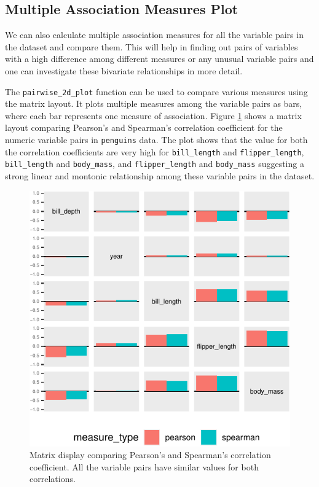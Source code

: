 \hypertarget{multiple-association-measures-plot}{%
\subsection{Multiple Association Measures
Plot}\label{multiple-association-measures-plot}}

We can also calculate multiple association measures for all the variable
pairs in the dataset and compare them. This will help in finding out
pairs of variables with a high difference among different measures or
any unusual variable pairs and one can investigate these bivariate
relationships in more detail.

The \texttt{pairwise\_2d\_plot} function can be used to compare various
measures using the matrix layout. It plots multiple measures among the
variable pairs as bars, where each bar represents one measure of
association. Figure \ref{fig:compare-matrix} shows a matrix layout
comparing Pearson's and Spearman's correlation coefficient for the
numeric variable pairs in \texttt{penguins} data. The plot shows that
the value for both the correlation coefficients are very high for
\texttt{bill\_length} and \texttt{flipper\_length},
\texttt{bill\_length} and \texttt{body\_mass}, and
\texttt{flipper\_length} and \texttt{body\_mass} suggesting a strong
linear and montonic relationship among these variable pairs in the
dataset.

\begin{Schunk}
\begin{figure}

{\centering \includegraphics{rj_paper_files/figure-latex/compare-matrix-1} 

}

\caption[Matrix display comparing Pearson's and Spearman's correlation coefficient]{Matrix display comparing Pearson's and Spearman's correlation coefficient. All the variable pairs have similar values for both correlations.}\label{fig:compare-matrix}
\end{figure}
\end{Schunk}

